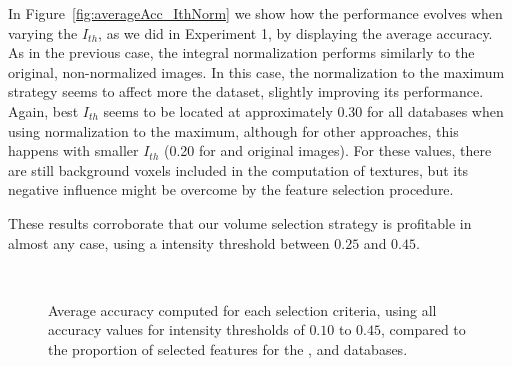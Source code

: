In Figure~\ref{fig:averageAcc_IthNorm} we show how the performance evolves when varying the $I_{th}$, as we did in Experiment 1, by displaying the average accuracy. As in the previous case, the integral normalization performs similarly to the original, non-normalized images. In this case, the normalization to the maximum strategy seems to affect more the \vdlvdat{} dataset, slightly improving its performance. Again, best $I_{th}$ seems to be located at approximately 0.30 for all databases when using normalization to the maximum, although for other approaches, this happens with smaller $I_{th}$ (0.20 for \vdlndat{} and \vdlvdat{} original images). For these values, there are still background voxels included in the computation of textures, but its negative influence might be overcome by the feature selection procedure. 

These results corroborate that our volume selection strategy is profitable in almost any case, using a intensity threshold between $0.25$ and $0.45$. 

\begin{figure}[ht]
	\centering
	\\
	\caption[Average accuracy computed for each selection criteria over $N$ in Experiment 2.]{Average accuracy computed for each selection criteria, using all accuracy values for intensity thresholds of $0.10$ to $0.45$, compared to the proportion of selected features for the \ppmidat{}, \vdlndat{} and \vdlvdat{}{} databases.}
	\label{fig:experiment4}
\end{figure}

